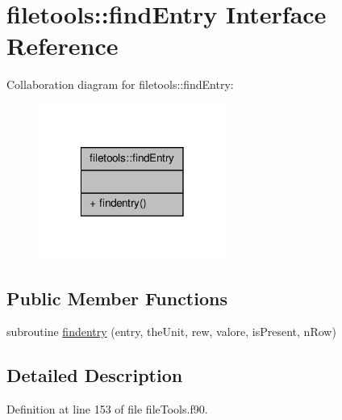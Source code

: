 \hypertarget{interfacefiletools_1_1find_entry}{\section{filetools\-:\-:find\-Entry Interface Reference}
\label{interfacefiletools_1_1find_entry}
}


Collaboration diagram for filetools\-:\-:find\-Entry\-:\nopagebreak
\begin{figure}[H]
\begin{center}
\leavevmode
\includegraphics[width=174pt]{interfacefiletools_1_1find_entry__coll__graph}
\end{center}
\end{figure}
\subsection*{Public Member Functions}
\begin{DoxyCompactItemize}
\item 
subroutine \hyperlink{interfacefiletools_1_1find_entry_a850f330e19410327017ded432bedab00}{findentry} (entry, the\-Unit, rew, valore, is\-Present, n\-Row)
\end{DoxyCompactItemize}


\subsection{Detailed Description}


Definition at line 153 of file file\-Tools.\-f90.



